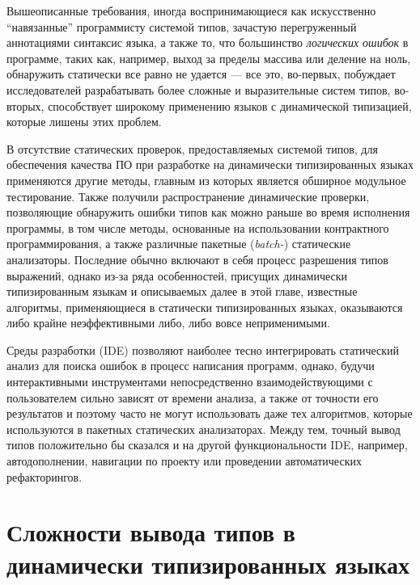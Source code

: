 
Вышеописанные требования, иногда воспринимающиеся как искусственно ``навязанные''
программисту системой типов, зачастую перегруженный аннотациями синтаксис языка,
а также то, что большинство \emph{логических ошибок} в программе, таких как, например,
выход за пределы массива или деление на ноль, обнаружить статически все равно не
удается --- все это, во-первых, побуждает исследователей разрабатывать более
сложные и выразительные систем типов, во-вторых, способствует широкому
применению языков с динамической типизацией, которые лишены этих проблем.

В отсутствие статических проверок, предоставляемых системой типов, для
обеспечения качества ПО при разработке на динамически типизированных языках
применяются другие методы, главным из которых является обширное модульное
тестирование. Также получили распространение динамические проверки, позволяющие
обнаружить ошибки типов как можно раньше во время исполнения программы, в том
числе методы, основанные на использовании контрактного программирования, а также
различные пакетные (\emph{batch-}) статические анализаторы. Последние обычно
включают в себя процесс разрешения типов выражений, однако из-за ряда
особенностей, присущих динамически типизированным языкам и описываемых далее в
этой главе, известные алгоритмы, применяющиеся в статически типизированных
языках, оказываются либо крайне неэффективными либо, либо вовсе неприменимыми.

Среды разработки (IDE) позволяют наиболее тесно интегрировать статический анализ
для поиска ошибок в процесс написания программ, однако, будучи
интерактивными инструментами непосредственно взаимодействующими с пользователем
сильно зависят от времени анализа, а также от точности его результатов и поэтому
часто не могут использовать даже тех алгоритмов, которые используются в пакетных
статических анализаторах. Между тем, точный вывод типов положительно бы сказался
и на другой функциональности IDE, например, автодополнении, навигации по проекту
или проведении автоматических рефакторингов.


\section{Сложности вывода типов в динамически типизированных языках}
\label{sec:difficulties}

